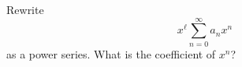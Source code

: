 Rewrite 
\[
x^\ell \sum_{n = 0}^\infty a_n x^n
\] 
as a
power series.
What is the coefficient of $x^n$?
